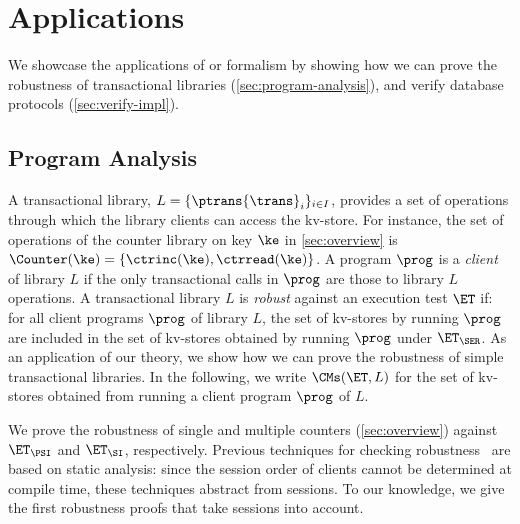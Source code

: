 \vspace*{-5pt}
\section{Applications}
\vspace*{-5pt}
\label{sec:applications}

We showcase the applications of or formalism by showing how we can prove the robustness of transactional libraries (\cref{sec:program-analysis}), and verify database protocols
 (\cref{sec:verify-impl}).

\vspace*{-4pt}
\subsection{Program Analysis}
\vspace*{-4pt}
\label{sec:program-analysis}
A transactional library, $L = \{\ptrans{\trans}_{i}\}_{i \in I}$, 
provides a set of operations through which the library clients can access the kv-store. 
For instance, the set of operations of the counter library on key $\ke$ in \cref{sec:overview} is $\Counter(\ke) = \{\ctrinc(\ke), \ctrread(\ke)\}$.
A program $\prog$ is a \emph{client} of library $L$ if the only transactional calls in $\prog$ are those to library $L$ operations.  
A transactional library $L$ is \emph{robust} against an execution test $\ET$ if: 
for all client programs $\prog$ of library $L$, the set of kv-stores by running $\prog$ are included in the set of kv-stores obtained by running $\prog$ under $\ET_{\SER}$.
As an application of our theory, we show how we can prove the robustness of simple transactional libraries. 
In the following, we write $\CMs(\ET, L)$ for the set of kv-stores obtained from running a client program $\prog$ of $L$. 

We prove the robustness of single and multiple counters (\cref{sec:overview}) against $\ET_{\PSI}$ and $\ET_{\SI}$, respectively.
Previous techniques for checking robustness~\cite{giovanni_concur16,SIanalysis,laws,sureshConcur} 
are based on static analysis: since the session order of clients cannot be determined at compile 
time, these techniques abstract from sessions. 
To our knowledge, we give the first robustness proofs that take sessions into account.

